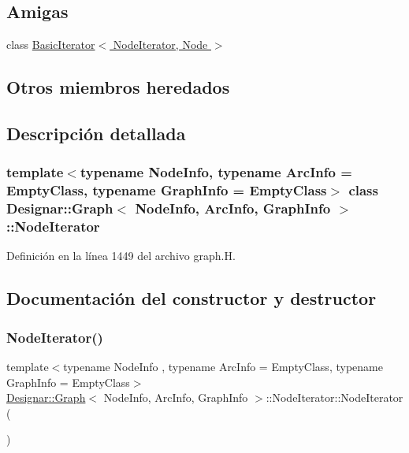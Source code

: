 \subsection*{Amigas}
\begin{DoxyCompactItemize}
\item 
class \hyperlink{class_designar_1_1_graph_1_1_node_iterator_a21dc6ae614d097ff896e9e8e422d8f3c}{Basic\+Iterator$<$ Node\+Iterator, Node $>$}
\end{DoxyCompactItemize}
\subsection*{Otros miembros heredados}


\subsection{Descripción detallada}
\subsubsection*{template$<$typename Node\+Info, typename Arc\+Info = Empty\+Class, typename Graph\+Info = Empty\+Class$>$\newline
class Designar\+::\+Graph$<$ Node\+Info, Arc\+Info, Graph\+Info $>$\+::\+Node\+Iterator}



Definición en la línea 1449 del archivo graph.\+H.



\subsection{Documentación del constructor y destructor}
\mbox{\label{class_designar_1_1_graph_1_1_node_iterator_a0449a6ba6cd5d43c04567210a8a064b1}} 
\subsubsection{\texorpdfstring{Node\+Iterator()}{NodeIterator()}\hspace{0.1cm}{\footnotesize\ttfamily [1/5]}}
{\footnotesize\ttfamily template$<$typename Node\+Info , typename Arc\+Info  = Empty\+Class, typename Graph\+Info  = Empty\+Class$>$ \\
\hyperlink{class_designar_1_1_graph}{Designar\+::\+Graph}$<$ Node\+Info, Arc\+Info, Graph\+Info $>$\+::Node\+Iterator\+::\+Node\+Iterator (\begin{DoxyParamCaption}{ }\end{DoxyParamCaption})\hspace{0.3cm}{\ttfamily [inline]}}



